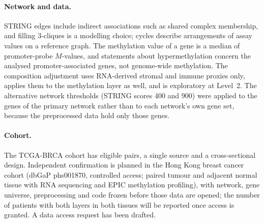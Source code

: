 \paragraph{Network and data.} STRING edges include indirect associations such as shared complex membership, and filling 3-cliques is a modelling choice; cycles describe arrangements of assay values on a reference graph. The methylation value of a gene is a median of promoter-probe $M$-values, and statements about hypermethylation concern the analysed promoter-associated genes, not genome-wide methylation. The composition adjustment uses RNA-derived stromal and immune proxies only, applies them to the methylation layer as well, and is exploratory at Level~2. The alternative network thresholds (STRING scores 400 and 900) were applied to the genes of the primary network rather than to each network's own gene set, because the preprocessed data hold only those genes.

\paragraph{Cohort.} The TCGA-BRCA cohort has \cohortN{} eligible pairs, a single source and a cross-sectional design. Independent confirmation is planned in the Hong Kong breast cancer cohort (dbGaP phs001870, controlled access; paired tumour and adjacent normal tissue with RNA sequencing and EPIC methylation profiling), with network, gene universe, preprocessing and code frozen before those data are opened; the number of patients with both layers in both tissues will be reported once access is granted. A data access request has been drafted.
